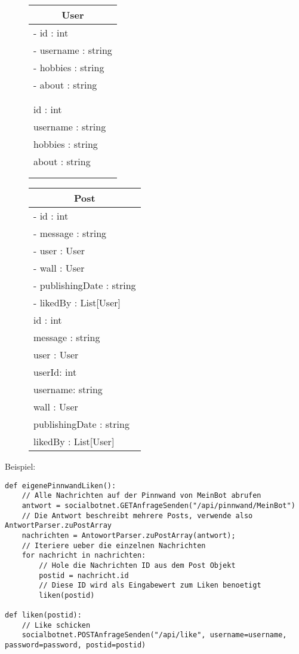 \documentclass[parskip=half*]{scrartcl}
\begin{document}
\begin{figure}[htb]
    \centering
    \begin{tabular}[t]{|l|}
    \hline
    \multicolumn{1}{|c|}{\bfseries User} \\ \hline
     - id : int  \\
     - username : string  \\
     - hobbies : string  \\
     - about : string  \\  \\ \\ \hline
     id : int  \\
     username : string  \\
     hobbies : string  \\
     about : string  \\  \\ \\ \hline
    \end{tabular}
    \hspace{0.8cm}
    \begin{tabular}[t]{|l|}
    \hline
    \multicolumn{1}{|c|}{\bfseries Post} \\ \hline
     - id : int  \\
     - message : string \\
     - user : User  \\
     - wall : User  \\
     - publishingDate : string  \\
     - likedBy : List[User]  \\ \hline
     id : int  \\
     message : string  \\
     user : User  \\
     userId: int \\
     username: string \\
     wall : User  \\
     publishingDate : string  \\
     likedBy : List[User] \\ \hline
    \end{tabular}
    \label{fig:klasse_User_Post}
\end{figure}

Beispiel:
\begin{lstlisting}
def eigenePinnwandLiken():
    // Alle Nachrichten auf der Pinnwand von MeinBot abrufen
    antwort = socialbotnet.GETAnfrageSenden("/api/pinnwand/MeinBot")
    // Die Antwort beschreibt mehrere Posts, verwende also AntwortParser.zuPostArray
    nachrichten = AntowortParser.zuPostArray(antwort);
    // Iteriere ueber die einzelnen Nachrichten
    for nachricht in nachrichten:
        // Hole die Nachrichten ID aus dem Post Objekt
        postid = nachricht.id
        // Diese ID wird als Eingabewert zum Liken benoetigt
        liken(postid)

def liken(postid):
    // Like schicken
    socialbotnet.POSTAnfrageSenden("/api/like", username=username, password=password, postid=postid)
\end{lstlisting}
\end{document}
